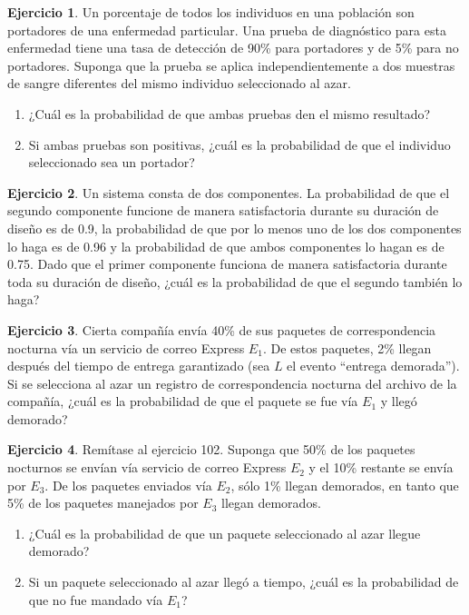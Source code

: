 \documentclass[
  11pt,
]{book}
\theoremstyle{definition}
\theoremstyle{definition}
\theoremstyle{definition}
\newtheorem{exercise}{Ejercicio}[chapter]
\theoremstyle{definition}
\theoremstyle{remark}
\begin{document}
\begin{exercise}

Un porcentaje de todos los individuos en una población son portadores de una enfermedad particular. Una prueba de diagnóstico para esta enfermedad tiene una tasa de detección de 90\% para portadores y de 5\% para no portadores. Suponga que la prueba se aplica independientemente a dos muestras de sangre diferentes del mismo individuo seleccionado al azar.

\begin{enumerate}
\def\labelenumi{\alph{enumi}.}
\item
  ¿Cuál es la probabilidad de que ambas pruebas den el mismo resultado?
\item
  Si ambas pruebas son positivas, ¿cuál es la probabilidad de que el individuo seleccionado sea un portador?
\end{enumerate}

\end{exercise}

\begin{exercise}
Un sistema consta de dos componentes. La probabilidad de que el segundo componente funcione de manera satisfactoria durante su duración de diseño es de 0.9, la probabilidad de que por lo menos uno de los dos componentes lo haga es de 0.96 y la probabilidad de que ambos componentes lo hagan es de 0.75. Dado que el primer componente funciona de manera satisfactoria durante toda su duración de diseño, ¿cuál es la probabilidad de que el segundo también lo haga?
\end{exercise}

\begin{exercise}
Cierta compañía envía 40\% de sus paquetes de correspondencia nocturna vía un servicio de correo Express \(E_1\). De estos paquetes, 2\% llegan después del tiempo de entrega garantizado (sea \(L\) el evento ``entrega demorada''). Si se selecciona al azar un registro de correspondencia nocturna del archivo de la compañía, ¿cuál es la probabilidad de que el paquete se fue vía \(E_1\) y llegó demorado?
\end{exercise}

\begin{exercise}

Remítase al ejercicio 102. Suponga que 50\% de los paquetes nocturnos se envían vía servicio de correo Express \(E_2\) y el 10\% restante se envía por \(E_3\). De los paquetes enviados vía \(E_2\), sólo 1\% llegan demorados, en tanto que 5\% de los paquetes manejados por \(E_3\) llegan demorados.

\begin{enumerate}
\def\labelenumi{\alph{enumi}.}
\item
  ¿Cuál es la probabilidad de que un paquete seleccionado al azar llegue demorado?
\item
  Si un paquete seleccionado al azar llegó a tiempo, ¿cuál es la probabilidad de que no fue mandado vía \(E_1\)?
\end{enumerate}

\end{exercise}
\end{document}
